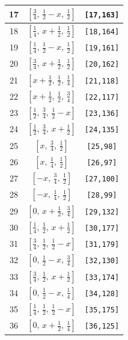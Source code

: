 \documentclass[fleqn,8pt]{jsarticle}
\begin{document}
\begin{longtable}{ccc}
17 & $\left[ \frac{3}{4},\, \frac{1}{2} - x,\, \frac{1}{2} \right]$ & {\tt [17,163]} \\ \hline
18 & $\left[ \frac{1}{4},\, x + \frac{1}{2},\, \frac{1}{2} \right]$ & {\tt [18,164]} \\ \hline
19 & $\left[ \frac{1}{4},\, \frac{1}{2} - x,\, \frac{1}{2} \right]$ & {\tt [19,161]} \\ \hline
20 & $\left[ \frac{3}{4},\, x + \frac{1}{2},\, \frac{1}{2} \right]$ & {\tt [20,162]} \\ \hline
21 & $\left[ x + \frac{1}{2},\, \frac{1}{2},\, \frac{1}{4} \right]$ & {\tt [21,118]} \\ \hline
22 & $\left[ x + \frac{1}{2},\, \frac{1}{2},\, \frac{3}{4} \right]$ & {\tt [22,117]} \\ \hline
23 & $\left[ \frac{1}{2},\, \frac{3}{4},\, \frac{1}{2} - x \right]$ & {\tt [23,136]} \\ \hline
24 & $\left[ \frac{1}{2},\, \frac{3}{4},\, x + \frac{1}{2} \right]$ & {\tt [24,135]} \\ \hline
25 & $\left[ x,\, \frac{3}{4},\, \frac{1}{2} \right]$ & {\tt [25,98]} \\ \hline
26 & $\left[ x,\, \frac{1}{4},\, \frac{1}{2} \right]$ & {\tt [26,97]} \\ \hline
27 & $\left[ - x,\, \frac{3}{4},\, \frac{1}{2} \right]$ & {\tt [27,100]} \\ \hline
28 & $\left[ - x,\, \frac{1}{4},\, \frac{1}{2} \right]$ & {\tt [28,99]} \\ \hline
29 & $\left[ 0,\, x + \frac{1}{2},\, \frac{3}{4} \right]$ & {\tt [29,132]} \\ \hline
30 & $\left[ \frac{1}{4},\, \frac{1}{2},\, x + \frac{1}{2} \right]$ & {\tt [30,177]} \\ \hline
31 & $\left[ \frac{3}{4},\, \frac{1}{2},\, \frac{1}{2} - x \right]$ & {\tt [31,179]} \\ \hline
32 & $\left[ 0,\, \frac{1}{2} - x,\, \frac{3}{4} \right]$ & {\tt [32,130]} \\ \hline
33 & $\left[ \frac{3}{4},\, \frac{1}{2},\, x + \frac{1}{2} \right]$ & {\tt [33,174]} \\ \hline
34 & $\left[ 0,\, \frac{1}{2} - x,\, \frac{1}{4} \right]$ & {\tt [34,128]} \\ \hline
35 & $\left[ \frac{1}{4},\, \frac{1}{2},\, \frac{1}{2} - x \right]$ & {\tt [35,175]} \\ \hline
36 & $\left[ 0,\, x + \frac{1}{2},\, \frac{1}{4} \right]$ & {\tt [36,125]} \\ \hline

\end{longtable}
\end{document}
